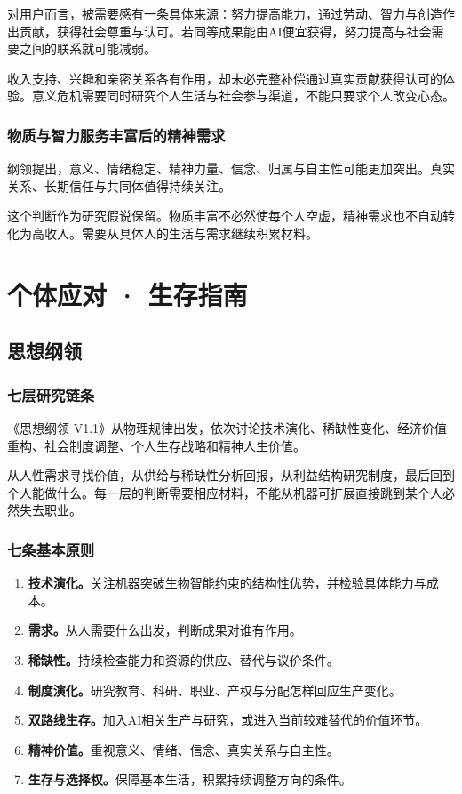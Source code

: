 \documentclass[UTF8,zihao=-4,fontset=fandol,oneside,openany]{ctexbook}
\begin{document}
对用户而言，被需要感有一条具体来源：努力提高能力，通过劳动、智力与创造作出贡献，获得社会尊重与认可。若同等成果能由AI便宜获得，努力提高与社会需要之间的联系就可能减弱。

收入支持、兴趣和亲密关系各有作用，却未必完整补偿通过真实贡献获得认可的体验。意义危机需要同时研究个人生活与社会参与渠道，不能只要求个人改变心态。

\subsection*{物质与智力服务丰富后的精神需求}
纲领提出，意义、情绪稳定、精神力量、信念、归属与自主性可能更加突出。真实关系、长期信任与共同体值得持续关注。

这个判断作为研究假说保留。物质丰富不必然使每个人空虚，精神需求也不自动转化为高收入。需要从具体人的生活与需求继续积累材料。

\chapter{个体应对 · 生存指南}
\section{思想纲领}
\subsection*{七层研究链条}
《思想纲领 V1.1》从物理规律出发，依次讨论技术演化、稀缺性变化、经济价值重构、社会制度调整、个人生存战略和精神人生价值\cite{principles}。

从人性需求寻找价值，从供给与稀缺性分析回报，从利益结构研究制度，最后回到个人能做什么。每一层的判断需要相应材料，不能从机器可扩展直接跳到某个人必然失去职业。

\subsection*{七条基本原则}
\begin{enumerate}
\item \textbf{技术演化。}关注机器突破生物智能约束的结构性优势，并检验具体能力与成本。
\item \textbf{需求。}从人需要什么出发，判断成果对谁有作用。
\item \textbf{稀缺性。}持续检查能力和资源的供应、替代与议价条件。
\item \textbf{制度演化。}研究教育、科研、职业、产权与分配怎样回应生产变化。
\item \textbf{双路线生存。}加入AI相关生产与研究，或进入当前较难替代的价值环节。
\item \textbf{精神价值。}重视意义、情绪、信念、真实关系与自主性。
\item \textbf{生存与选择权。}保障基本生活，积累持续调整方向的条件。
\end{enumerate}
\end{document}

